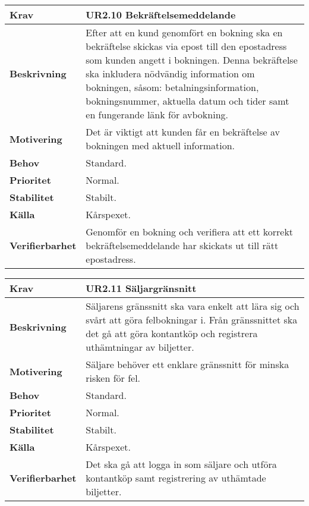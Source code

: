 \documentclass[a4paper, twoside, 11pt, titlepage]{article}
\begin{document}
		\begin {table} [ht] \begin{tabular} { p{2.6cm} p{12.5cm} }
			\hline
			{\sffamily\textbf{Krav}} & {\sffamily\textbf{UR2.10 Bekräftelsemeddelande }} \\
			\hline
			{\sffamily\textbf{Beskrivning}} & {Efter att en kund genomfört en bokning ska en bekräftelse skickas via epost till den epostadress som kunden angett i bokningen. Denna bekräftelse ska inkludera nödvändig information om bokningen, såsom: betalningsinformation, bokningsnummer, aktuella datum och tider samt en fungerande länk för avbokning.} \\
			\hline
			{\sffamily\textbf{Motivering}} & {Det är viktigt att kunden får en bekräftelse av bokningen med aktuell information.} \\
			\hline
			{\sffamily\textbf{Behov}} & {Standard.} \\
			\hline
			{\sffamily\textbf{Prioritet}} & {Normal.} \\
			\hline
			{\sffamily\textbf{Stabilitet}} & {Stabilt.} \\
			\hline
			{\sffamily\textbf{Källa}} & {Kårspexet.} \\
			\hline
			{\sffamily\textbf{Verifierbarhet}} & {Genomför en bokning och verifiera att ett korrekt bekräftelsemeddelande har skickats ut till rätt epostadress.} \\
			\hline
		\end{tabular} \end{table} \FloatBarrier
		\vspace{6mm}

		\begin {table} [ht] \begin{tabular} { p{2.6cm} p{12.5cm} }
			\hline
			{\sffamily\textbf{Krav}} & {\sffamily\textbf{UR2.11 Säljargränsnitt }} \\
			\hline
			{\sffamily\textbf{Beskrivning}} & {Säljarens gränssnitt ska vara enkelt att lära sig och svårt att göra felbokningar i. Från gränssnittet ska det gå att göra kontantköp och registrera uthämtningar av biljetter.} \\
			\hline
			{\sffamily\textbf{Motivering}} & {Säljare behöver ett enklare gränssnitt för minska risken för fel.} \\
			\hline
			{\sffamily\textbf{Behov}} & {Standard.} \\
			\hline
			{\sffamily\textbf{Prioritet}} & {Normal.} \\
			\hline
			{\sffamily\textbf{Stabilitet}} & {Stabilt.} \\
			\hline
			{\sffamily\textbf{Källa}} & {Kårspexet.} \\
			\hline
			{\sffamily\textbf{Verifierbarhet}} & {Det ska gå att logga in som säljare och utföra kontantköp samt registrering av uthämtade biljetter.} \\
			\hline
		\end{tabular} \end{table} \FloatBarrier
		\vspace{6mm}
\end{document}
